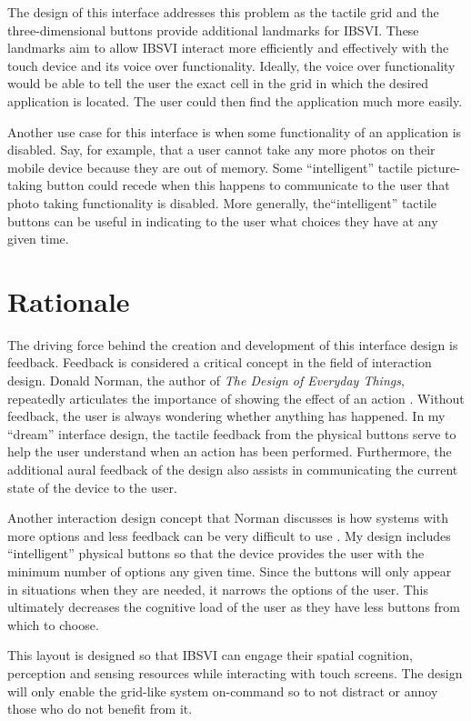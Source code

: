 \documentclass[11pt]{article}
\begin{document}
The design of this interface addresses this problem as the tactile grid and the three-dimensional buttons provide additional landmarks for IBSVI. These landmarks aim to allow IBSVI interact more efficiently and effectively with the touch device and its voice over functionality. Ideally, the voice over functionality would be able to tell the user the exact cell in the grid in which the desired application is located. The user could then find the application much more easily.

Another use case for this interface is when some functionality of an application is disabled. Say, for example, that a user cannot take any more photos on their mobile device because they are out of memory. Some ``intelligent'' tactile picture-taking button could recede when this happens to communicate to the user that photo taking functionality is disabled. More generally, the``intelligent'' tactile buttons can be useful in indicating to the user what choices they have at any given time.

\section{Rationale}
The driving force behind the creation and development of this interface design is feedback. Feedback is considered a critical concept in the field of interaction design. Donald Norman, the author of \textit{The Design of Everyday Things}, repeatedly articulates the importance of showing the effect of an action \cite{Norman02}. Without feedback, the user is always wondering whether anything has happened. In my ``dream'' interface design, the tactile feedback from the physical buttons serve to help the user understand when an action has been performed. Furthermore, the additional aural feedback of the design also assists in communicating the current state of the device to the user.

Another interaction design concept that Norman discusses is how systems with more options and less feedback can be very difficult to use \cite{Norman02}. My design includes ``intelligent'' physical buttons so that the device provides the user with the minimum number of options any given time. Since the buttons will only appear in situations when they are needed, it narrows the options of the user. This ultimately decreases the cognitive load of the user as they have less buttons from which to choose.

This layout is designed so that IBSVI can engage their spatial cognition, perception and sensing resources while interacting with touch screens. The design will only enable the grid-like system on-command so to not distract or annoy those who do not benefit from it.
\end{document}
